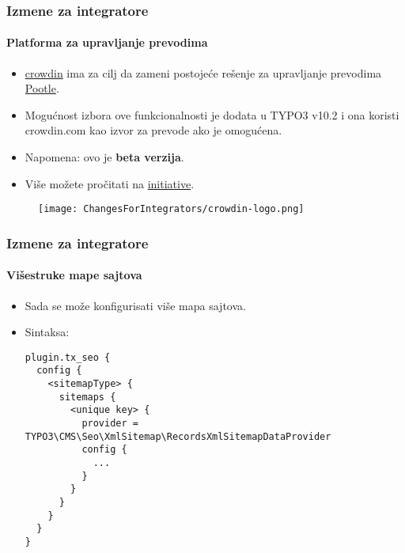 
\begin{frame}[fragile]
	\frametitle{Izmene za integratore}
	\framesubtitle{Platforma za upravljanje prevodima}

	\begin{itemize}

		\item \href{https://crowdin.com/}{crowdin} ima za cilj da zameni postojeće rešenje
			za upravljanje prevodima \href{https://translation.typo3.org/}{Pootle}.

		\item Mogućnost izbora ove funkcionalnosti je dodata u TYPO3 v10.2 i ona koristi crowdin.com
			kao izvor za prevode ako je omogućena.

		\item Napomena: ovo je \textbf{beta verzija}.

		\item Više možete pročitati na
			\href{https://typo3.org/community/teams/typo3-development/initiatives/localization-with-crowdin/}{initiative}.

	\end{itemize}

	\begin{figure}
		\texttt{[image: ChangesForIntegrators/crowdin-logo.png]}
	\end{figure}

\end{frame}


\begin{frame}[fragile]
	\frametitle{Izmene za integratore}
	\framesubtitle{Višestruke mape sajtova}

	\lstset{basicstyle=\tiny\ttfamily}

	\begin{itemize}

		\item Sada se može konfigurisati više mapa sajtova.
		\item Sintaksa:
\begin{lstlisting}
plugin.tx_seo {
  config {
    <sitemapType> {
      sitemaps {
        <unique key> {
          provider = TYPO3\CMS\Seo\XmlSitemap\RecordsXmlSitemapDataProvider
          config {
            ...
          }
        }
      }
    }
  }
}
\end{lstlisting}

	\end{itemize}

\end{frame}

